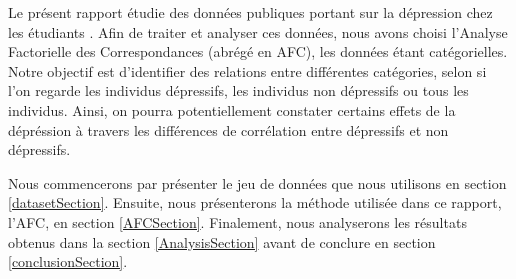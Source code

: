 Le présent rapport étudie des données publiques portant sur la dépression chez les étudiants \citep{dataset}. Afin de traiter et analyser ces données, nous avons choisi l'Analyse Factorielle des Correspondances (abrégé en AFC), les données étant catégorielles. Notre objectif est d'identifier des relations entre différentes catégories, selon si l'on regarde les individus dépressifs, les individus non dépressifs ou tous les individus. Ainsi, on pourra potentiellement constater certains effets de la dépréssion à travers les différences de corrélation entre dépressifs et non dépressifs.

Nous commencerons par présenter le jeu de données que nous utilisons en section \ref{datasetSection}.
Ensuite, nous présenterons la méthode utilisée dans ce rapport, l'AFC, en section \ref{AFCSection}. Finalement, nous analyserons les résultats obtenus dans la section \ref{AnalysisSection} avant de conclure en section \ref{conclusionSection}.

